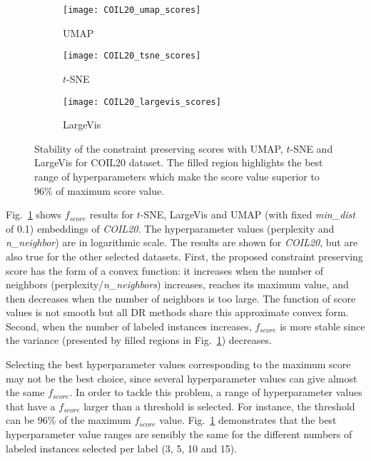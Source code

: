 \begin{figure}%
\begin{subfigure}[b]{0.32\linewidth}
     \centering
     \texttt{[image: COIL20\_umap\_scores]}
     \caption{UMAP}
\end{subfigure}
\hfill
\begin{subfigure}[b]{0.32\linewidth}
     \centering
     \texttt{[image: COIL20\_tsne\_scores]}
     \caption{$t$-SNE}
\end{subfigure}
\hfill
\begin{subfigure}[b]{0.32\linewidth}
     \centering
     \texttt{[image: COIL20\_largevis\_scores]}
     \caption{LargeVis}
\end{subfigure}
\caption{Stability of the constraint preserving scores with UMAP, $t$-SNE and LargeVis for COIL20 dataset.
The filled region highlights the best range of hyperparameters which make the score value superior to 96\% of maximum score value.}
\label{fig:score:stability:COIL20}
\end{figure}

Fig.~\ref{fig:score:stability:COIL20} shows $f_{score}$ results for $t$-SNE, LargeVis and UMAP (with fixed \emph{min\_dist} of 0.1) embeddings of \emph{COIL20}.
The hyperparameter values (perplexity and \emph{n\_neighbor}) are in logarithmic scale.
The results are shown for \emph{COIL20}, but are also true for the other selected datasets.
First, the proposed constraint preserving score has the form of a convex function: it increases when the number of neighbors (perplexity/\emph{n\_neighbors}) increases, reaches its maximum value, and then decreases when the number of neighbors is too large.
The function of score values is not smooth but all DR methods share this approximate convex form.
Second, when the number of labeled instances increases, $f_{score}$ is more stable since the variance (presented by filled regions in Fig.~\ref{fig:score:stability:COIL20}) decreases.

Selecting the best hyperparameter values corresponding to the maximum score may not be the best choice, since several hyperparameter values can give almost the same $f_{score}$.
In order to tackle this problem, a range of hyperparameter values that have a $f_{score}$ larger than a threshold is selected. For instance, the threshold can be 96\% of the maximum $f_{score}$ value.
Fig.~\ref{fig:score:stability:COIL20} demonstrates that the best hyperparameter value ranges are sensibly the same for the different numbers of labeled instances selected per label (3, 5, 10 and 15).

